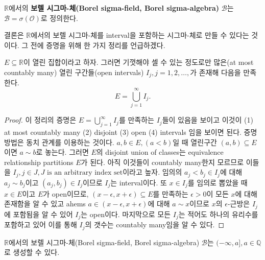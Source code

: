 \documentclass[b5paper,]{scrbook}
\theoremstyle{plain}
\theoremstyle{definition}
\numberwithin{equation}{section}
\let\BeginKnitrBlock\begin \let\EndKnitrBlock\end
\begin{document}
\BeginKnitrBlock{definition}[보렐 시그마-체]
\protect\hypertarget{def:unnamed-chunk-45}{}{\label{def:unnamed-chunk-45}
{} }\(\mathbb{R}\)에서의 \textbf{보렐
시그마-체(Borel sigma-field, Borel sigma-algebra)} \(\mathcal{B}\)는
\(\mathcal{B}=\sigma(\mathcal{O})\)로 정의한다.
\EndKnitrBlock{definition}

결론은 \(\mathbb{R}\)에서의 보렐 시그마-체를 interval을 포함하는
시그마-체로 만들 수 있다는 것이다. 그 전에 증명을 위해 한 가지 정리를
언급하겠다.

\BeginKnitrBlock{theorem}[열린 집합과 열린 구간들]
\protect\hypertarget{thm:unnamed-chunk-46}{}{\label{thm:unnamed-chunk-46}
{} }\(E \subseteq \mathbb{R}\)이
열린 집합이라고 하자. 그러면 기껏해야 셀 수 있는 정도로만 많은(at most
countably many) 열린 구간들(open intervals) \(I_{j}, j=1,2,\ldots,\)가
존재해 다음을 만족한다. \[E=\bigcup_{j=1}^{\infty}I_{j}.\]
\EndKnitrBlock{theorem}

\BeginKnitrBlock{proof}
{}이 정리의 증명은
\(E=\bigcup_{j=1}^{\infty}I_{j}\)를 만족하는 \(I_{j}\)들이 있음을 보이고
이것이 (1) at most countably many (2) disjoint (3) open (4) intervals
임을 보이면 된다. 증명 방법은 동치 관계를 이용하는 것이다.
\(a, b \in E, (a < b)\)일 때 열린구간 \((a,b)\subseteq E\)이면
\(a \sim b\)로 놓는다. 그러면 \(E\)의 disjoint union of classes는
equivalence relationship partitions \(E\)가 된다. 아직 이것들이
countably many한지 모르므로 이들을
\(I_{j}, j\in J, J \text{ is an arbitrary index set}\)이라고 높자.
임의의 \(a_{j}<b_{j}\in I_{j}\)에 대해 \(a_{j} \sim b_{j}\)이고
\((a_{j}, b_{j}) \in I_{j}\)이므로 \(I_{j}\)는 interval이다. 또
\(x\in I_{j}\)를 임의로 뽑았을 때 \(x\in E\)이고 \(E\)가 open이므로,
\((x-\epsilon, x+\epsilon)\subseteq E\)를 만족하는 \(\epsilon >0\)이
모든 \(x\)에 대해 존재함을 알 수 있고 ahems
\(a\in (x-\epsilon, x+\epsilon)\)에 대해 \(a \sim x\)이므로 \(x\)의
\(\epsilon\)-근방은 \(I_{j}\)에 포함됨을 알 수 있어 \(I_{j}\)는
open이다. 마지막으로 모든 \(I_{j}\)는 적어도 하나의 유리수를 포함하고
있어 이를 통해 \(I_{j}\)의 갯수는 countably many임을 알 수 있다.
\EndKnitrBlock{proof}

\BeginKnitrBlock{theorem}[실수 구간에서의 보렐 시그마-체의 생성]
\protect\hypertarget{thm:unnamed-chunk-48}{}{\label{thm:unnamed-chunk-48}
{}
}\(\mathbb{R}\)에서의 보렐 시그마-체(Borel sigma-field, Borel
sigma-algebra) \(\mathcal{B}\)는 \((-\infty, a], a\in\mathbb{Q}\)로
생성할 수 있다.
\EndKnitrBlock{theorem}
\end{document}
